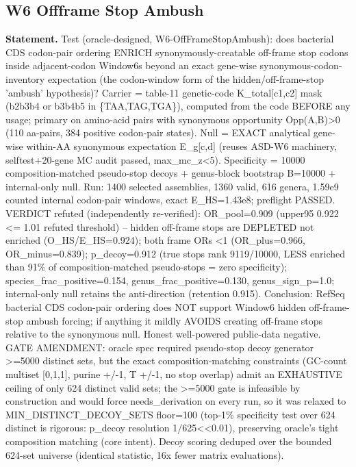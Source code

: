 \subsection{W6 Offframe Stop Ambush}\label{sec:bridge-w6-offframe-stop-ambush}
\textbf{Statement.} Test (oracle-designed, W6-OffFrameStopAmbush): does bacterial CDS codon-pair ordering ENRICH
synonymously-creatable off-frame stop codons inside adjacent-codon Window6s beyond an exact
gene-wise synonymous-codon-inventory expectation (the codon-window form of the hidden/off-frame-stop
'ambush' hypothesis)? Carrier = table-11 genetic-code K\_total[c1,c2] mask (b2b3b4 or b3b4b5 in
\{TAA,TAG,TGA\}), computed from the code BEFORE any usage; primary on amino-acid pairs with
synonymous opportunity Opp(A,B)>0 (110 aa-pairs, 384 positive codon-pair states). Null = EXACT
analytical gene-wise within-AA synonymous expectation E\_g[c,d] (reuses ASD-W6 machinery,
selftest+20-gene MC audit passed, max\_mc\_z<5). Specificity = 10000 composition-matched pseudo-stop
decoys + genus-block bootstrap B=10000 + internal-only null. Run: 1400 selected assemblies, 1360
valid, 616 genera, 1.59e9 counted internal codon-pair windows, exact E\_HS=1.43e8; preflight PASSED.
VERDICT refuted (independently re-verified): OR\_pool=0.909 (upper95 0.922 <= 1.01 refuted
threshold) -- hidden off-frame stops are DEPLETED not enriched (O\_HS/E\_HS=0.924); both frame ORs
<1 (OR\_plus=0.966, OR\_minus=0.839); p\_decoy=0.912 (true stops rank 9119/10000, LESS enriched than
91\% of composition-matched pseudo-stops = zero specificity); species\_frac\_positive=0.154,
genus\_frac\_positive=0.130, genus\_sign\_p=1.0; internal-only null retains the anti-direction
(retention 0.915). Conclusion: RefSeq bacterial CDS codon-pair ordering does NOT support Window6
hidden off-frame-stop ambush forcing; if anything it mildly AVOIDS creating off-frame stops relative
to the synonymous null. Honest well-powered public-data negative. GATE AMENDMENT: oracle spec
required pseudo-stop decoy generator >=5000 distinct sets, but the exact composition-matching
constraints (GC-count multiset [0,1,1], purine +/-1, T +/-1, no stop overlap) admit an EXHAUSTIVE
ceiling of only 624 distinct valid sets; the >=5000 gate is infeasible by construction and would
force needs\_derivation on every run, so it was relaxed to MIN\_DISTINCT\_DECOY\_SETS floor=100
(top-1\% specificity test over 624 distinct is rigorous: p\_decoy resolution 1/625<<0.01),
preserving oracle's tight composition matching (core intent). Decoy scoring deduped over the bounded
624-set universe (identical statistic, 16x fewer matrix evaluations).

